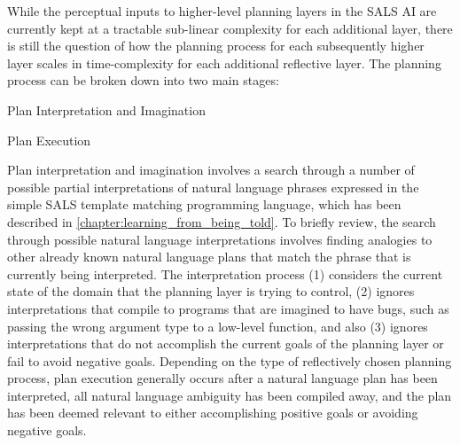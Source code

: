 While the perceptual inputs to higher-level planning layers in the
SALS AI are currently kept at a tractable sub-linear complexity for
each additional layer, there is still the question of how the planning
process for each subsequently higher layer scales in time-complexity
for each additional reflective layer.  The planning process can be
broken down into two main stages:
\begin{packed_enumerate}
\item{Plan Interpretation and Imagination}
\item{Plan Execution}
\end{packed_enumerate}
Plan interpretation and imagination involves a search through a number
of possible partial interpretations of natural language phrases
expressed in the simple SALS template matching programming language,
which has been described in
{\mbox{\autoref{chapter:learning_from_being_told}}}.
To briefly review, the search through possible natural language
interpretations involves finding analogies to other already known
natural language plans that match the phrase that is currently being
interpreted.  The interpretation process (1) considers the current
state of the domain that the planning layer is trying to control, (2)
ignores interpretations that compile to programs that are imagined to
have bugs, such as passing the wrong argument type to a low-level
function, and also (3) ignores interpretations that do not accomplish
the current goals of the planning layer or fail to avoid negative
goals.  Depending on the type of reflectively chosen planning process,
plan execution generally occurs after a natural language plan has been
interpreted, all natural language ambiguity has been compiled away,
and the plan has been deemed relevant to either accomplishing positive
goals or avoiding negative goals.

